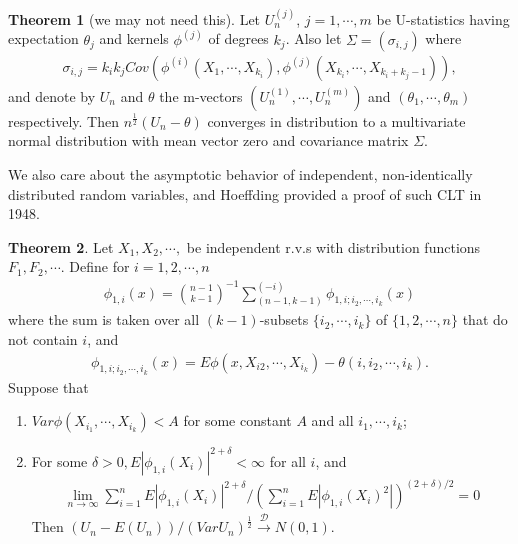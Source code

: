 \documentclass{article}
\theoremstyle{definition}
\newtheorem{theorem}{Theorem}
\numberwithin{Def}{section}
\begin{document}
    \begin{theorem}[we may not need this]
    Let $U_n^{(j)}$, $j = 1, \cdots, m$ be U-statistics having expectation $\theta_j$ and kernels $\phi^{(j)}$ of degrees $k_j$. Also let $\Sigma = (\sigma_{i,j})$ where 
    \begin{align*}
        \sigma_{i,j} = k_i k_j Cov(\phi^{(i)} (X_1, \cdots, X_{k_i}), \phi^{(j)} (X_{k_i}, \cdots, X_{k_i + k_j -1})),
    \end{align*}
    and denote by $U_n$ and $\theta$ the m-vectors $(U_n^{(1)}, \cdots, U_n^{(m)})$ and $(\theta_1, \cdots, \theta_m)$ respectively. Then $n^{\frac{1}{2}}(U_n - \theta)$ converges in distribution to a multivariate normal distribution with mean vector zero and covariance matrix $\Sigma$.
    \end{theorem}
    
    We also care about the asymptotic behavior of independent, non-identically distributed random variables, and Hoeffding provided a proof of such CLT in 1948. 
    \begin{theorem}
    Let $X_1, X_2, \cdots,$ be independent r.v.s with distribution functions $F_1, F_2, \cdots$. Define for $i = 1,2, \cdots, n$
    \begin{align}
        \phi_{1,i} (x) = {n-1 \choose k-1}^{-1} \sum_{(n-1, k-1)}^{(-i)} \phi_{1, i; i_2, \cdots, i_k}(x)
    \end{align}
    where the sum is taken over all $(k-1)$-subsets $\{i_2, \cdots, i_k\}$ of $\{1,2, \cdots, n\}$ that do not contain $i$, and 
    \begin{align}
        \phi_{1, i; i_2, \cdots, i_k}(x) = E \phi(x, X_{i2}, \cdots, X_{i_k}) - \theta(i, i_2, \cdots, i_k).
    \end{align}
    Suppose that 
    \begin{enumerate}[label = (\roman*)]
        \item $Var \phi(X_{i_1}, \cdots, X_{i_k} ) < A$ for some constant $A$ and all $i_1, \cdots, i_k$;
        \item For some $\delta > 0, E|\phi_{1, i} (X_i) |^{2 + \delta} < \infty$ for all $i$, and 
        \begin{align}
            \lim_{n \rightarrow \infty} \sum_{i =1}^{n} E|\phi_{1, i} (X_i) |^{2 + \delta} \Big/ (\sum_{i =1}^{n} E|\phi_{1, i} (X_i)^2 |) ^{(2 + \delta)/2} = 0
        \end{align}
       Then $(U_n - E(U_n)) / (Var U_n)^{\frac{1}{2}} \xrightarrow{\mathcal{D}} N(0,1).$ 
    \end{enumerate}
    \end{theorem}
\end{document}
